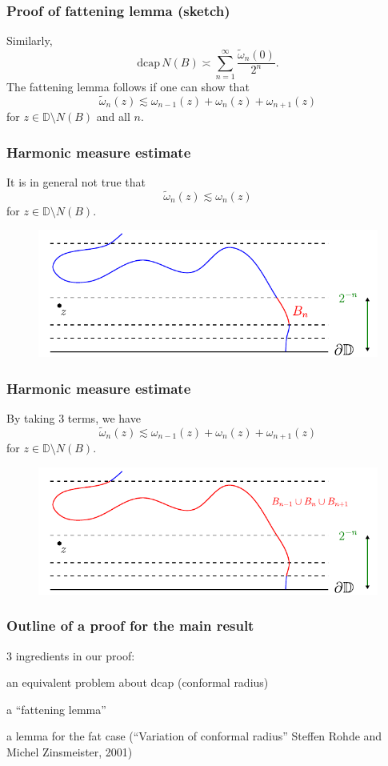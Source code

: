 \documentclass[xcolor=pdftex,dvipsnames,table]{beamer}
\newcommand{\bbD}{\mathbb{D}}
\newcommand{\go}{\omega}
\newcommand{\dcap}{\text{dcap}}
\theoremstyle{definition}
\begin{document}
\begin{frame}
  \frametitle{Proof of fattening lemma (sketch)}
  Similarly,
   \[
       \dcap \, N(B) \asymp \sum_{n=1}^{\infty} \frac{\widetilde{\go}_n(0)}{2^n}.
  \]
  The fattening lemma follows if one can show that
  \[
      \widetilde{\go}_n(z) \lesssim \go_{n-1}(z) + \go_n(z) + \go_{n+1}(z)
  \]
  for $z \in \bbD \setminus N(B)$ and all $n$.
\end{frame}

\begin{frame}
  \frametitle{Harmonic measure estimate}
  It is in general not true that
  \[
      \widetilde{\go}_n(z) \lesssim \go_n(z)
  \]
  for $z \in \bbD \setminus N(B)$.
  \begin{figure}
      \includegraphics[scale=0.8]{harmEst.pdf}
  \end{figure}
\end{frame}

\begin{frame}
  \frametitle{Harmonic measure estimate}
  By taking 3 terms, we have
  \[
       \widetilde{\go}_n(z) \lesssim \go_{n-1}(z) + \go_n(z) + \go_{n+1}(z)
  \]
  for $z \in \bbD \setminus N(B)$.
  \begin{figure}
      \includegraphics[scale=0.8]{harmEst_01.pdf}
  \end{figure}
\end{frame}
 
\begin{frame}
  \frametitle{Outline of a proof for the main result}
  3 ingredients in our proof: \vspace{.2in}
  \begin{enumerate} \setlength{\itemsep}{.2in}
    \item  {\color{black!30} an equivalent problem about dcap (conformal radius)
    \item  a ``fattening lemma''}
    \item  a lemma for the fat case (``Variation of conformal radius''
              Steffen Rohde and Michel Zinsmeister, 2001)
  \end{enumerate}
\end{frame}
\end{document}
